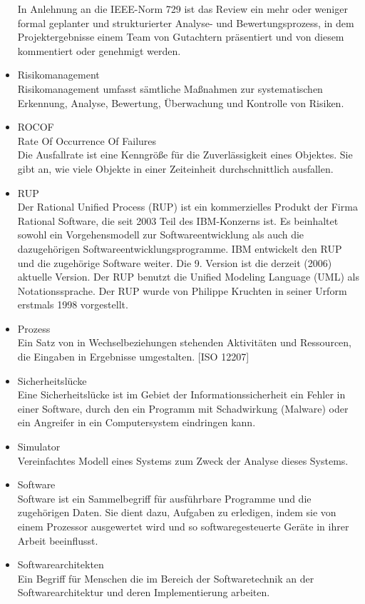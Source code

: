 \begin{itemize}
In Anlehnung an die IEEE-Norm 729 ist das Review ein mehr oder weniger formal geplanter und strukturierter Analyse- und Bewertungsprozess, in dem Projektergebnisse einem Team von Gutachtern präsentiert und von diesem kommentiert oder genehmigt werden.
\item 	Risikomanagement\\
Risikomanagement umfasst sämtliche Maßnahmen zur systematischen Erkennung, Analyse, Bewertung, Überwachung und Kontrolle von Risiken.
\item 	ROCOF \\ Rate Of Occurrence Of Failures \\Die Ausfallrate ist eine Kenngröße für die Zuverlässigkeit eines Objektes. Sie gibt an, wie viele Objekte in einer Zeiteinheit durchschnittlich ausfallen.
\item 	RUP\\Der Rational Unified Process (RUP) ist ein kommerzielles Produkt der Firma Rational Software, die seit 2003 Teil des IBM-Konzerns ist. Es beinhaltet sowohl ein Vorgehensmodell zur Softwareentwicklung als auch die dazugehörigen Softwareentwicklungsprogramme. IBM entwickelt den RUP und die zugehörige Software weiter. Die 9. Version ist die derzeit (2006) aktuelle Version. Der RUP benutzt die Unified Modeling Language (UML) als Notationssprache. Der RUP wurde von Philippe Kruchten in seiner Urform erstmals 1998 vorgestellt.
\item Prozess \\ Ein Satz von in Wechselbeziehungen stehenden Aktivitäten und Ressourcen, die Eingaben in Ergebnisse umgestalten. [ISO 12207]
\item 	Sicherheitslücke\\Eine Sicherheitslücke ist im Gebiet der Informationssicherheit ein Fehler in einer Software, durch den ein Programm mit Schadwirkung (Malware) oder ein Angreifer in ein Computersystem eindringen kann.
\item 	Simulator\\Vereinfachtes Modell eines Systems zum Zweck der Analyse dieses Systems.
\item 	Software\\
Software ist ein Sammelbegriff für ausführbare Programme und die zugehörigen Daten. Sie dient dazu, Aufgaben zu erledigen, indem sie von einem Prozessor ausgewertet wird und so softwaregesteuerte Geräte in ihrer Arbeit beeinflusst.
\item 	Softwarearchitekten \\
Ein Begriff für Menschen die im Bereich der Softwaretechnik an der Softwarearchitektur und deren Implementierung arbeiten.

\end{itemize}
